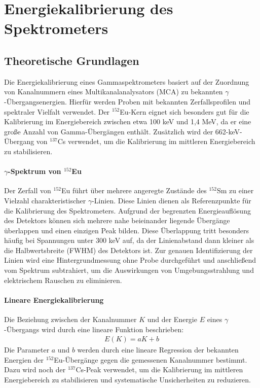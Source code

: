 \section{Energiekalibrierung des Spektrometers}
\subsection{Theoretische Grundlagen}
Die Energiekalibrierung eines Gammaspektrometers basiert auf der Zuordnung von Kanalnummern eines Multikanalanalysators (MCA) zu bekannten $\gamma$-Übergangsenergien. Hierfür werden Proben mit bekannten Zerfallsprofilen und spektraler Vielfalt verwendet. Der $^{152}$Eu-Kern eignet sich besonders gut für die Kalibrierung im Energiebereich zwischen etwa 100 keV und 1,4 MeV, da er eine große Anzahl von Gamma-Übergängen enthält. Zusätzlich wird der 662-keV-Übergang von $^{137}$Cs verwendet, um die Kalibrierung im mittleren Energiebereich zu stabilisieren.
\paragraph{$\gamma$-Spektrum von $^{152}$Eu}
Der Zerfall von $^{152}$Eu führt über mehrere angeregte Zustände des $^{152}$Sm zu einer Vielzahl charakteristischer $\gamma$-Linien.
Diese Linien dienen als Referenzpunkte für die Kalibrierung des Spektrometers.
Aufgrund der begrenzten Energieauflösung des Detektors können sich mehrere nahe beieinander liegende Übergänge überlappen und einen einzigen Peak bilden. Diese Überlappung tritt besonders häufig bei Spannungen unter 300 keV auf, da der Linienabstand dann kleiner als die Halbwertsbreite (FWHM) des Detektors ist.
Zur genauen Identifizierung der Linien wird eine Hintergrundmessung ohne Probe durchgeführt und anschließend vom Spektrum subtrahiert, um die Auswirkungen von Umgebungsstrahlung und elektrischem Rauschen zu eliminieren.
\paragraph{Lineare Energiekalibrierung}
Die Beziehung zwischen der Kanalnummer $K$ und der Energie $E$ eines $\gamma$-Übergangs wird durch eine lineare Funktion beschrieben:
\begin{align*}    
    E(K) = aK + b
\end{align*}
Die Parameter $a$ und $b$ werden durch eine lineare Regression der bekannten Energien der $^{152}$Eu-Übergänge gegen die gemessenen Kanalnummer bestimmt. \\
Dazu wird noch der $^{137}$Cs-Peak verwendet, um die Kalibrierung im mittleren Energiebereich zu stabilisieren und systematische Unsicherheiten zu reduzieren.
